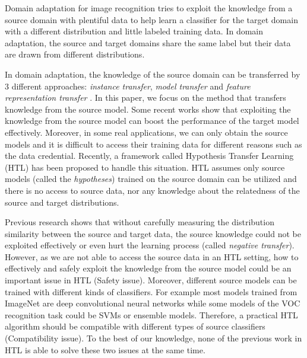 Domain adaptation for image recognition tries to exploit the knowledge from a source domain with plentiful data to help learn a classifier for the target domain with a different distribution and little labeled training data. In domain adaptation, the source and target domains share the same label but their data are drawn from different distributions.

In domain adaptation, the knowledge of the source domain can be transferred by 3 different approaches: \textit{instance transfer}, \textit{model transfer} and \textit{feature representation transfer} \cite{pan2010survey}. In this paper, we focus on the method that transfers knowledge from the source model. Some recent works show that exploiting the knowledge from the source model can boost the performance of the target model effectively\cite{tommasi2014learning}\cite{kuzborskij2013n}.
Moreover, in some real applications, we can only obtain the source models and it is difficult to access their training data for different reasons such as the data credential.   
Recently, a framework called Hypothesis Transfer Learning (HTL) \cite{kuzborskij2013stability} has been proposed to handle this situation. HTL assumes only source models (called the \textit{hypotheses}) trained on the source domain can be utilized and there is no access to source data, nor any knowledge about the relatedness of the source and target distributions. 


Previous research \cite{ben2010theory} \cite{ben2007analysis} shows that without carefully measuring the distribution similarity between the source and target data, the source knowledge could not be exploited effectively or even hurt the learning process (called  \textit{negative transfer})\cite{pan2010survey}. 
However, as we are not able to access the source data in an HTL setting, how to effectively and safely exploit the knowledge from the source model could be an important issue in HTL (Safety issue). Moreover, different source models can be trained with different kinds of classifiers. For example most models trained from ImageNet are deep convolutional neural networks while some models of the VOC recognition task could be SVMs or ensemble models. Therefore, a practical HTL algorithm should be compatible with different types of source classifiers (Compatibility issue). To the best of our knowledge, none of the previous work in HTL is able to solve these two issues at the same time.

